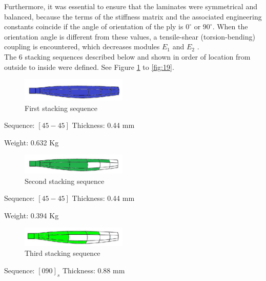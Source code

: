 Furthermore, it was essential to ensure that the laminates were symmetrical and balanced, because the terms of the stiffness matrix and the associated engineering constants coincide if the angle of orientation of the ply is $0^\circ$ or $90^\circ$. When the orientation angle is different from these values, a tensile-shear (torsion-bending) coupling is encountered, which decreases modules $E_1$ and $E_2$ \cite{miravete2}.\\

The 6 stacking sequences described below and shown in order of location from outside to inside were defined. See Figure \ref{fig:14} to \ref{fig:19}. 

\begin{figure}[H]
\begin{center}
  \includegraphics[width=0.45\textwidth]{p7}
\caption{First stacking sequence  }
\label{fig:14}       %
\end{center}
\end{figure}
Sequence: $[45  -45]$ \hspace{1cm}Thickness: 0.44 mm

\hspace{2cm}Weight: 0.632 Kg

\begin{figure}[H]
\begin{center}
  \includegraphics[width=0.45\textwidth]{p8}
\caption{Second stacking sequence  }
\label{fig:15}       %
\end{center}
\end{figure}
Sequence: $[45  -45]$	\hspace{1cm}Thickness: 0.44 mm

\hspace{2cm}Weight: 0.394 Kg
\begin{figure}[H]
\begin{center}
  \includegraphics[width=0.45\textwidth]{p9}
\caption{Third stacking sequence  }
\label{fig:16}       %
\end{center}
\end{figure}
Sequence: $[0  90]_s$	\hspace{1cm}Thickness: 0.88 mm 

